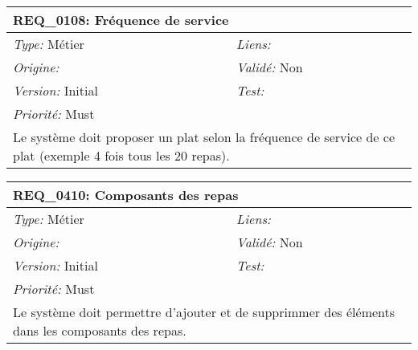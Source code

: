 \begin{table}[!h]

\begin{tabular}{|p{60mm}p{100mm}|}

\hline

\multicolumn{2}{|l|}{\textbf{REQ\_0108:} Fréquence de service} \\ \hline

\emph{Type:} Métier & \emph{Liens:}  \\

\emph{Origine:}  & \emph{Validé:} Non \\

\emph{Version:} Initial & \emph{Test:}  \\

\emph{Priorité:} Must & \\ \hline

\multicolumn{2}{|p{16cm}|}{Le système doit proposer un plat selon la fréquence de service de ce plat (exemple 4 fois tous les 20 repas).} \\ \hline

\end{tabular}

\end{table}



\begin{table}[!h]

\begin{tabular}{|p{60mm}p{100mm}|}

\hline

\multicolumn{2}{|l|}{\textbf{REQ\_0410:} Composants des repas} \\ \hline

\emph{Type:} Métier & \emph{Liens:}  \\

\emph{Origine:}  & \emph{Validé:} Non \\

\emph{Version:} Initial & \emph{Test:}  \\

\emph{Priorité:} Must & \\ \hline

\multicolumn{2}{|p{16cm}|}{Le système doit permettre d'ajouter et de supprimmer des éléments dans les composants des repas.} \\ \hline

\end{tabular}

\end{table}



